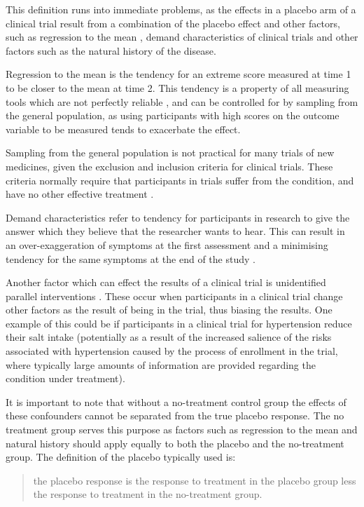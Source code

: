 This definition runs into immediate problems, as the effects in a placebo arm of a clinical trial result from a combination of the placebo effect and other factors, such as regression to the mean \cite{Morton2003}, demand characteristics of clinical trials \cite{HrAbjartsson2001} and other factors such as the natural history of the disease.   

Regression to the mean is the tendency for an extreme score measured at time 1 to be closer to the mean at time 2. This tendency is a property of all measuring tools which are not perfectly reliable \cite{Morton2003}, and can be controlled for by sampling from the general population, as using participants with high scores on the outcome variable to be measured tends to exacerbate the effect. 

Sampling from the general population is not practical for many trials of new medicines, given the exclusion and inclusion criteria for clinical trials. These criteria normally require that participants in trials suffer from the condition, and have no other effective treatment \cite{Daugherty2008}.   

Demand characteristics \cite{Fernandez1994,weber1972subject} refer to tendency for participants in research to give the answer which they believe that the researcher wants to hear. This can result in an over-exaggeration of symptoms at the first assessment and a minimising tendency for the same symptoms at the end of the study \cite{Vase2005}.  

Another factor which can effect the results of a clinical trial is unidentified parallel interventions \cite{Ernst1995b}. These occur when participants in a clinical trial change other factors as the result of being in the trial, thus biasing the results. One example of this could be if participants in a clinical trial for hypertension reduce their salt intake (potentially as a result of the increased salience of the risks associated with hypertension caused by the process of enrollment in the trial, where typically large amounts of information are provided regarding the condition under treatment). 

It is important to note that without a no-treatment control group the effects of these confounders cannot be separated from the true placebo response.  The no treatment group serves this purpose as factors such as regression to the mean and natural history should apply equally to both the placebo and the no-treatment group.  The definition of the placebo typically used is:
\begin{quotation}
 the placebo response is the response to treatment in the placebo group less the response to treatment in the no-treatment group.  
\end{quotation}

